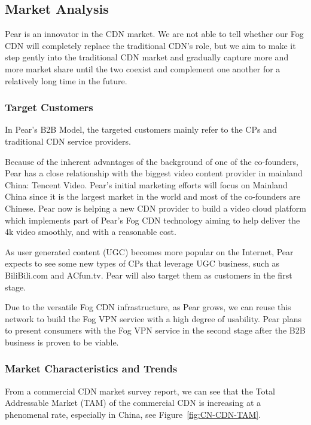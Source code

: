 \subsection{Market Analysis}
Pear is an innovator in the CDN market. We are not able to tell whether our Fog CDN will completely replace the traditional CDN's role, but we aim to make it step gently into the traditional CDN market and gradually capture more and more market share until the two coexist and complement one another for a relatively long time in the future. 

\subsubsection{Target Customers}
In Pear's B2B Model, the targeted customers mainly refer to the CPs and traditional CDN service providers. 

Because of the inherent advantages of the background of one of the co-founders, Pear has a close relationship with the biggest video content provider in mainland China: Tencent Video. Pear's initial marketing efforts will focus on Mainland China since it is the largest market in the world and most of the co-founders are Chinese. 
Pear now is helping a new CDN provider to build a video cloud platform which implements part of Pear's Fog CDN technology aiming to help deliver the 4k video smoothly, and with a reasonable cost.

As user generated content (UGC) becomes more popular on the Internet, Pear expects to see some new types of CPs that leverage UGC business, such as BiliBili.com and ACfun.tv. Pear will also target them as customers in the first stage.

Due to the versatile Fog CDN infrastructure, as Pear grows, we can reuse this network to build the Fog VPN service with a high degree of usability. Pear plans to present consumers with the Fog VPN service in the second stage after the B2B business is proven to be viable.

\subsubsection{Market Characteristics and Trends}
From a commercial CDN market survey report, we can see that the Total Addressable Market (TAM) of the commercial CDN is increasing at a phenomenal rate, especially in China, see Figure~\ref{fig:CN-CDN-TAM}. 

